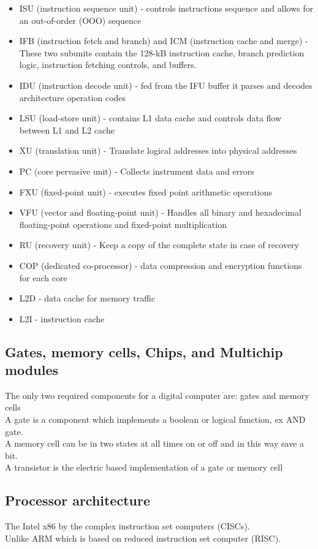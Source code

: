 \documentclass[12pt, a4paper]{article}
\begin{document}
			\begin{itemize}
				\item ISU (instruction sequence unit) - controls instructions sequence and allows for an out-of-order (OOO) sequence
				\item IFB (instruction fetch and branch) and ICM (instruction cache and merge) - These two subunits contain the 128-kB instruction cache, branch prediction logic, instruction fetching controls, and buffers.
				\item IDU (instruction decode unit) - fed from the IFU buffer it parses and decodes architecture operation codes
				\item LSU (load-store unit) - contains L1 data cache and controls data flow between L1 and L2 cache
				\item XU (translation unit) - Translate logical addresses into physical addresses
				\item PC (core pervasive unit) - Collects instrument data and errors
				\item FXU (fixed-point unit) - executes fixed point arithmetic operations
				\item VFU (vector and floating-point unit) - Handles all binary and hexadecimal floating-point operations and fixed-point multiplication
				\item RU (recovery unit) - Keep a copy of the complete state in case of recovery
				\item COP (dedicated co-processor) - data compression and encryption functions for each core
				\item L2D - data cache for memory traffic
				\item L2I - instruction cache
			\end{itemize}
		\subsection{Gates, memory cells, Chips, and Multichip modules}
			The only two required components for a digital computer are: gates and memory cells\\
			A gate is a component which implements a boolean or logical function, ex AND gate.\\
			A memory cell can be in two states at all times on or off and in this way save a bit.\\
			A transistor is the electric based implementation of a gate or memory cell\\
		\subsection{Processor architecture}
			The Intel x86 by the complex instruction set computers (CISCs).\\
			Unlike ARM which is based on reduced instruction set computer (RISC).\\
\end{document}

